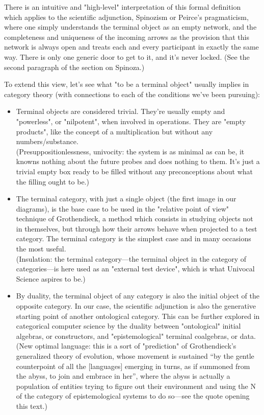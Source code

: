 \documentclass[11pt]{article}
\begin{document}
There is an intuitive and "high-level" interpretation of this formal definition which
applies to the scientific adjunction, Spinozism or Peirce's pragmaticism, where one
simply understands the terminal object as an empty network, and the completeness and
uniqueness of the incoming arrows as the provision that this network is always open and
treats each and every participant in exactly the same way. There is only one generic
door to get to it, and it's never locked. (See the second paragraph of the section on
Spinoza.)

To extend this view, let's see what "to be a terminal object" usually implies in
category theory (with connections to each of the conditions we've been pursuing):

\begin{itemize}

\item Terminal objects are considered trivial. They're usually empty and "powerless", or
"nilpotent", when involved in operations. They are "empty products", like the concept of
a multiplication but without any numbers/substance.\\
(Presuppositionlessness, univocity: the system is as minimal as can be, it knowns
nothing about the future probes and does nothing to them. It's just a trivial empty box
ready to be filled without any preconceptions about what the filling ought to be.)

\item The terminal category, with just a single object (the first image in our diagrams), is
the base case to be used in the "relative point of view" technique of Grothendieck, a
method which consists in studying objects not in themselves, but through how their
arrows behave when projected to a test category. The terminal category is the simplest
case and in many occasions the most useful.\\
(Insulation: the terminal category---the terminal object in the category of
categories---is here used as an "external test device", which is what Univocal Science
aspires to be.)

\item By duality, the terminal object of any category is also the initial object of the
opposite category. In our case, the scientific adjunction is also the generative
starting point of another ontological category. This can be further explored in
categorical computer science by the duality between "ontological" initial algebras, or
constructors, and "epistemological" terminal coalgebras, or
data.\\ (New optimal language: this is a sort of
"prediction" of Grothendieck's generalized theory of evolution, whose movement is
sustained ``by the gentle counterpoint of all the [languages] emerging in turns, as if
summoned from the abyss, to join and embrace in her'', where the abyss is actually a
population of entities trying to figure out their environment and using the N of the
category of epistemological systems to do so---see the quote opening this text.)

\end{itemize}
\end{document}
